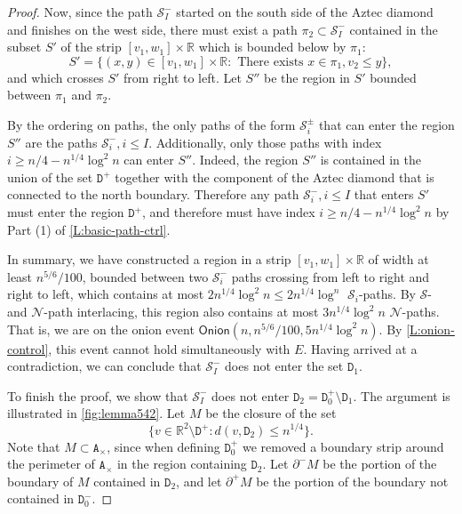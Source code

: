 \documentclass[11pt,twoside]{amsart}
\theoremstyle{plain}
\numberwithin{quest}{section}
\theoremstyle{remark}
\numberwithin{rem}{section}
\theoremstyle{definition}
\newcommand{\R}{\mathbb{R}}
\newcommand{\cS}{\mathcal{S}}
\newcommand{\cN}{\mathcal{N}}
\renewcommand{\tt}[1]{{\mathtt{#1}}}
\begin{document}
\begin{proof}
		Now, since the path $\cS_I^-$ started on the south side of the Aztec diamond and finishes on the west side, there must exist a path $\pi_2 \subset \cS_I^-$ contained in the subset $S'$ of the strip $[v_1, w_1] \times \R$ which is bounded below by $\pi_1$:
		$$
		S' = \{(x, y) \in [v_1, w_1] \times \R : \text{ There exists } x \in \pi_1, v_2 \le y \},
		$$
		and which crosses $S'$ from right to left. Let $S''$ be the region in $S'$ bounded between $\pi_1$ and $\pi_2$. 
		
		By the ordering on paths, the only paths of the form $\cS^\pm_i$ that can enter the region $S''$ are the paths $\cS^-_i, i \le I$. Additionally, only those paths with index $i \ge n/4 - n^{1/4} \log^2 n$ can enter $S''$.	Indeed, the region $S''$ is contained in the union of the set $\tt{D}^+$ together with the component of the Aztec diamond that is connected to the north boundary. Therefore any path $\cS^-_i, i \le I$ that enters $S'$ must enter the region $\tt{D}^+$, and therefore must have index $i \ge n/4 - n^{1/4} \log^2 n$ by Part (1) of \cref{L:basic-path-ctrl}. 
		
		In summary, we have constructed a region in a strip $[v_1, w_1] \times \R$ of width at least $n^{5/6}/100$, bounded between two $\cS_i^-$ paths crossing from left to right and right to left, which contains at most $2 n^{1/4} \log^2 n \le 2 n^{1/4} \log^n$ $\cS_i$-paths. By $\cS$- and $\cN$-path interlacing, this region also contains at most $3n^{1/4} \log^2 n$ $\cN$-paths. That is, we are on the onion event
		$
		\mathsf{Onion}(n, n^{5/6}/100, 5n^{1/4}\log^2 n).
		$
		By \cref{L:onion-control}, this event cannot hold simultaneously with $E$. Having arrived at a contradiction, we can conclude that $\cS_I^-$ does not enter the set $\tt{D}_1$.
		
		To finish the proof, we show that $\cS_I^-$ does not enter $
        \tt{D}_2 = \tt{D}^+_0 \setminus \tt{D}_1$. The argument is illustrated in \cref{fig:lemma542}. Let $M$ be the closure of the set
		$$
		\{v \in \R^2 \setminus \tt{D}^+ : d(v, \tt{D}_2) \le n^{1/4}\}.
		$$
		Note that $M \subset \tt{A}_\times$, since when defining $\tt{D}_0^+$ we removed a boundary strip around the perimeter of $\tt{A}_\times$ in the region containing $\tt{D}_2$. Let $\partial^- M$ be the portion of the boundary of $M$ contained in $\tt{D}_2$, and let $\partial^+ M$ be the portion of the boundary not contained in $\tt{D}_0^-$.
		

\end{proof}
\end{document}
